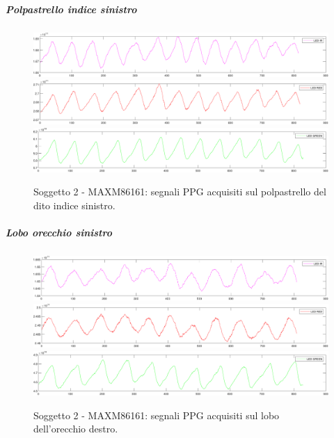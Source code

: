 \subparagraph{Polpastrello indice sinistro}
\begin{figure}[h]
	\centering
	\includegraphics[width=1\linewidth]{ImageFiles/Misure Preliminari/Soggetto 2/maxm86161/polpastrello_ir_moving_avg}
	\includegraphics[width=1\linewidth]{ImageFiles/Misure Preliminari/Soggetto 2/maxm86161/polpastrello_red_moving_avg}
	\includegraphics[width=1\linewidth]{ImageFiles/Misure Preliminari/Soggetto 2/maxm86161/polpastrello_green_moving_avg}
	\caption{Soggetto 2 - MAXM86161: segnali PPG acquisiti sul polpastrello del dito indice sinistro.}
	\label{fig:soggetto2_MAXM86161_polpastrello}
\end{figure}

\subparagraph{Lobo orecchio sinistro}
\begin{figure}[h]
	\centering
	\includegraphics[width=1\linewidth]{ImageFiles/Misure Preliminari/Soggetto 2/maxm86161/lobo_ir_moving_avg}
	\includegraphics[width=1\linewidth]{ImageFiles/Misure Preliminari/Soggetto 2/maxm86161/lobo_red_moving_avg}
	\includegraphics[width=1\linewidth]{ImageFiles/Misure Preliminari/Soggetto 2/maxm86161/lobo_green_moving_avg}
	\caption{Soggetto 2 - MAXM86161: segnali PPG acquisiti sul lobo dell'orecchio destro.}
	\label{fig:soggetto2_MAXM86161_lobo}
\end{figure}

